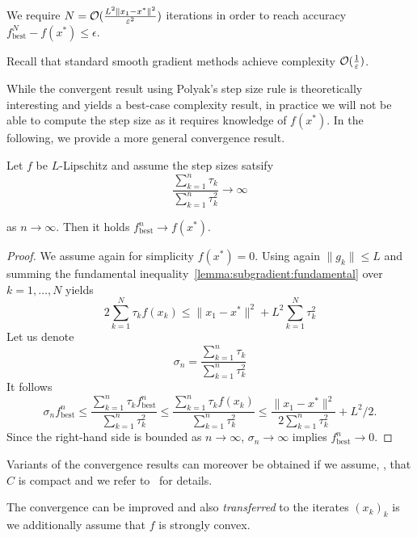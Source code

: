 \begin{cor}
    We require $N=\mathcal{O}(\frac{L^2\|x_1-x^*\|^2}{\varepsilon^2})$ iterations in order to reach accuracy $f_{\mathrm{best}}^N - f(x^*)\leq \epsilon$.
\end{cor}

\begin{rem}
    Recall that standard smooth gradient methods achieve complexity $\mathcal{O}(\frac{1}{\varepsilon})$.
\end{rem}

While the convergent result using Polyak's step size rule is theoretically interesting and yields a best-case complexity result, in practice we will not be able to compute the step size as it requires knowledge of $f(x^*)$. In the following, we provide a more general convergence result.

\begin{theorem}
    Let $f$ be $L$-Lipschitz and assume the step sizes satsify
    \[
        \frac{\sum_{k=1}^n\tau_k}{\sum_{k=1}^n\tau_k^2}\rightarrow \infty
    \]
\end{theorem}
as $n\rightarrow\infty$. Then it holds $f^n_{\mathrm{best}}\rightarrow f(x^*)$.
\begin{proof}
    We assume again for simplicity $f(x^*)=0$.
    Using again $\|g_k\|\leq L$ and summing the fundamental inequality~\cref{lemma:subgradient:fundamental} over $k=1,\dots, N$ yields
    \begin{equation}
        2\sum_{k=1}^N\tau_k f(x_k) \leq \|x_1-x^*\|^2 + L^2 \sum_{k=1}^N \tau_k^2 
    \end{equation}
    Let us denote
    \[
        \sigma_n = \frac{\sum_{k=1}^n\tau_k}{\sum_{k=1}^n\tau_k^2}
    \]
    It follows
    \begin{equation}
        \sigma_n f^n_{\mathrm{best}} 
        \leq \frac{\sum_{k=1}^n\tau_kf^n_{\mathrm{best}}}{\sum_{k=1}^n\tau_k^2}
        \leq \frac{\sum_{k=1}^n\tau_kf(x_k)}{\sum_{k=1}^n\tau_k^2}
        \leq \frac{\|x_1-x^*\|^2}{2\sum_{k=1}^n\tau_k^2} + L^2/2.
    \end{equation}
    Since the right-hand side is bounded as $n\rightarrow\infty$, $\sigma_n\rightarrow\infty$ implies $f^n_{\mathrm{best}}\rightarrow 0$.
\end{proof}

Variants of the convergence results can moreover be obtained if we assume, \eg, that $C$ is compact and we refer to~\cite{beck2017first} for details.

The convergence can be improved and also \emph{transferred} to the iterates $(x_k)_k$ is we additionally assume that $f$ is strongly convex.


